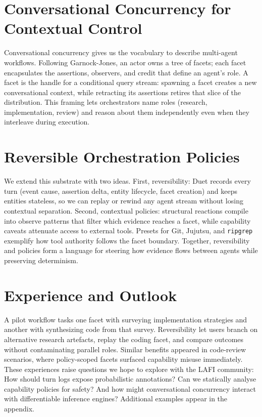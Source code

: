 \documentclass[sigplan,screen]{acmart}
\begin{document}
\section{Conversational Concurrency for Contextual Control}
Conversational concurrency gives us the vocabulary to describe multi-agent workflows. Following Garnock-Jones, an actor owns a tree of facets; each facet encapsulates the assertions, observers, and credit that define an agent's role. A facet is the handle for a conditional query stream: spawning a facet creates a new conversational context, while retracting its assertions retires that slice of the distribution. This framing lets orchestrators name roles (research, implementation, review) and reason about them independently even when they interleave during execution.

\section{Reversible Orchestration Policies}
We extend this substrate with two ideas. First, reversibility: Duet records every turn (event cause, assertion delta, entity lifecycle, facet creation) and keeps entities stateless, so we can replay or rewind any agent stream without losing contextual separation. Second, contextual policies: structural reactions compile into observe patterns that filter which evidence reaches a facet, while capability caveats attenuate access to external tools. Presets for Git, Jujutsu, and \texttt{ripgrep} exemplify how tool authority follows the facet boundary. Together, reversibility and policies form a language for steering how evidence flows between agents while preserving determinism.

\section{Experience and Outlook}
A pilot workflow tasks one facet with surveying implementation strategies and another with synthesizing code from that survey. Reversibility let users branch on alternative research artefacts, replay the coding facet, and compare outcomes without contaminating parallel roles. Similar benefits appeared in code-review scenarios, where policy-scoped facets surfaced capability misuse immediately. These experiences raise questions we hope to explore with the LAFI community: How should turn logs expose probabilistic annotations? Can we statically analyse capability policies for safety? And how might conversational concurrency interact with differentiable inference engines? Additional examples appear in the appendix.
\end{document}
